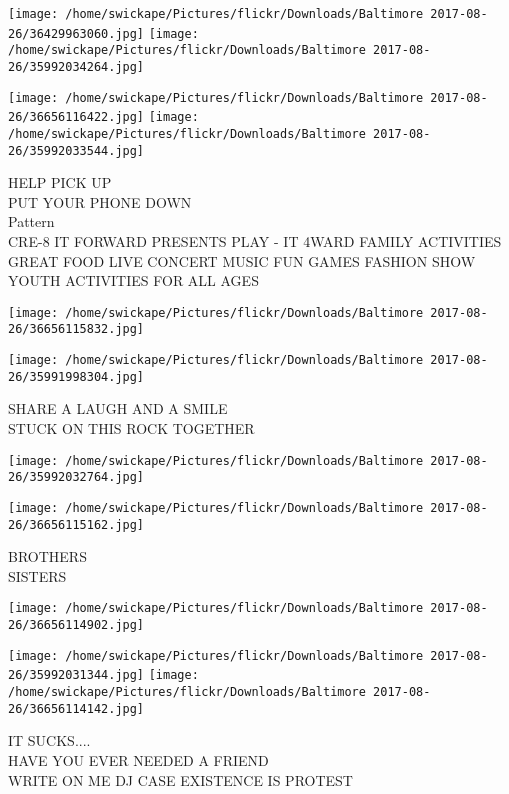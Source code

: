 \documentclass[10pt,letterpaper]{article}
\begin{document}
\texttt{[image: /home/swickape/Pictures/flickr/Downloads/Baltimore 2017-08-26/36429963060.jpg]}
\texttt{[image: /home/swickape/Pictures/flickr/Downloads/Baltimore 2017-08-26/35992034264.jpg]}

\texttt{[image: /home/swickape/Pictures/flickr/Downloads/Baltimore 2017-08-26/36656116422.jpg]}
\texttt{[image: /home/swickape/Pictures/flickr/Downloads/Baltimore 2017-08-26/35992033544.jpg]}

HELP PICK UP\\
PUT YOUR PHONE DOWN\\
Pattern\\
CRE{-}8 IT FORWARD PRESENTS PLAY {-} IT 4WARD FAMILY ACTIVITIES GREAT FOOD LIVE CONCERT MUSIC FUN GAMES FASHION SHOW YOUTH ACTIVITIES FOR ALL AGES\\
\pagebreak

\texttt{[image: /home/swickape/Pictures/flickr/Downloads/Baltimore 2017-08-26/36656115832.jpg]}

\vspace{0.25in}
\texttt{[image: /home/swickape/Pictures/flickr/Downloads/Baltimore 2017-08-26/35991998304.jpg]}

SHARE A LAUGH AND A SMILE\\
STUCK ON THIS ROCK TOGETHER\\
\pagebreak

\texttt{[image: /home/swickape/Pictures/flickr/Downloads/Baltimore 2017-08-26/35992032764.jpg]}

\vspace{0.25in}
\texttt{[image: /home/swickape/Pictures/flickr/Downloads/Baltimore 2017-08-26/36656115162.jpg]}

BROTHERS\\
SISTERS\\
\pagebreak

\texttt{[image: /home/swickape/Pictures/flickr/Downloads/Baltimore 2017-08-26/36656114902.jpg]}

\vspace{0.25in}
\texttt{[image: /home/swickape/Pictures/flickr/Downloads/Baltimore 2017-08-26/35992031344.jpg]}
\texttt{[image: /home/swickape/Pictures/flickr/Downloads/Baltimore 2017-08-26/36656114142.jpg]}

IT SUCKS....\\
HAVE YOU EVER NEEDED A FRIEND\\
WRITE ON ME DJ CASE EXISTENCE IS PROTEST\\
\pagebreak
\end{document}
